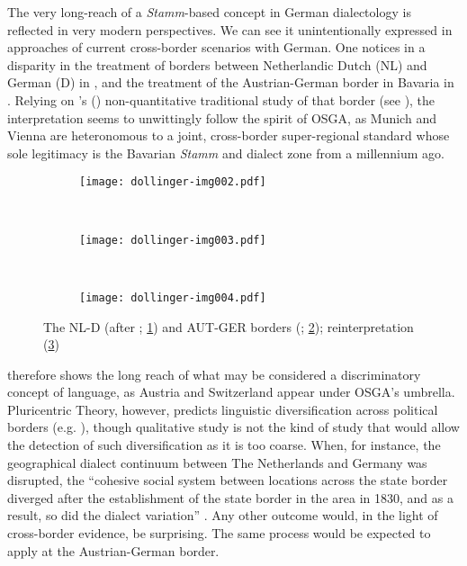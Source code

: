\documentclass[output=paper]{langscibook}
\begin{document}
The very long-reach of a \textit{Stamm}-based concept in German dialectology is reflected in very modern perspectives. We can see it unintentionally expressed in approaches of current cross-border scenarios with German. One notices in  a disparity in the treatment of borders between Netherlandic Dutch (NL) and German (D) in , and the treatment of the Austrian-German border in Bavaria in . Relying on \citeauthor{Scheuringer1990a}'s (\citeyear{Scheuringer1990a, Scheuringer1990b}) non-quantitative traditional study of that border (see \citealt[42--47]{Dollinger2019c}), the interpretation seems to unwittingly follow the spirit of OSGA, as Munich and Vienna are heteronomous to a joint, cross-border super-regional standard whose sole legitimacy is the Bavarian \textit{Stamm} and dialect zone from a millennium ago.

\begin{figure}
\begin{subfigure}{\textwidth}
  \centering
  \texttt{[image: dollinger-img002.pdf]} 
  \caption{}
  \label{fig:dollinger:2a}
\end{subfigure}
\smallskip\\

\begin{subfigure}{\textwidth}
  \centering
  \texttt{[image: dollinger-img003.pdf]} 
  \caption{}
  \label{fig:dollinger:2b}
\end{subfigure}
\smallskip\\

\begin{subfigure}{\textwidth}
  \centering
  \texttt{[image: dollinger-img004.pdf]} 
  \caption{}
  \label{fig:dollinger:2c}
\end{subfigure}

\caption{The NL-D (after \citealt[21]{Auer2005a}; \ref{fig:dollinger:2a}) and AUT-GER borders (\citealt[27]{Auer2005a}; \ref{fig:dollinger:2b});  reinterpretation (\ref{fig:dollinger:2c})}
\label{fig:dollinger:2}
\end{figure}

 therefore shows the long reach of what may be considered a discriminatory concept of language, as Austria and Switzerland appear under OSGA’s umbrella. Pluricentric Theory, however, predicts linguistic diversification across political borders (e.g. \citealt{Kremer1979,Boberg2000}), though  qualitative study is not the kind of study that would allow the detection of such diversification as it is too coarse. When, for instance, the geographical dialect continuum between The Netherlands and Germany was disrupted, the “cohesive social system between locations across the state border diverged after the establishment of the state border in the area in 1830, and as a result, so did the dialect variation” \citep[133]{DeVriendEtAl2009}. Any other outcome would, in the light of cross-border evidence, be surprising. The same process would be expected to apply at the Austrian-German border.
\end{document}
